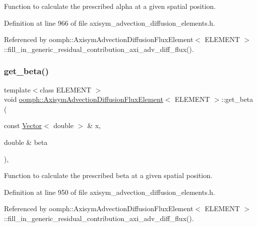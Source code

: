 Function to calculate the prescribed alpha at a given spatial position. 



Definition at line 966 of file axisym\+\_\+advection\+\_\+diffusion\+\_\+elements.\+h.



Referenced by oomph\+::\+Axisym\+Advection\+Diffusion\+Flux\+Element$<$ E\+L\+E\+M\+E\+N\+T $>$\+::fill\+\_\+in\+\_\+generic\+\_\+residual\+\_\+contribution\+\_\+axi\+\_\+adv\+\_\+diff\+\_\+flux().

\mbox{\label{classoomph_1_1AxisymAdvectionDiffusionFluxElement_ae221b92f7bf3ea7eeb26a1cc2b353941}} 
\subsubsection{\texorpdfstring{get\+\_\+beta()}{get\_beta()}}
{\footnotesize\ttfamily template$<$class E\+L\+E\+M\+E\+NT $>$ \\
void \hyperlink{classoomph_1_1AxisymAdvectionDiffusionFluxElement}{oomph\+::\+Axisym\+Advection\+Diffusion\+Flux\+Element}$<$ E\+L\+E\+M\+E\+NT $>$\+::get\+\_\+beta (\begin{DoxyParamCaption}\item[{const \hyperlink{classoomph_1_1Vector}{Vector}$<$ double $>$ \&}]{x,  }\item[{double \&}]{beta }\end{DoxyParamCaption})\hspace{0.3cm}{\ttfamily [inline]}, {\ttfamily [protected]}}



Function to calculate the prescribed beta at a given spatial position. 



Definition at line 950 of file axisym\+\_\+advection\+\_\+diffusion\+\_\+elements.\+h.



Referenced by oomph\+::\+Axisym\+Advection\+Diffusion\+Flux\+Element$<$ E\+L\+E\+M\+E\+N\+T $>$\+::fill\+\_\+in\+\_\+generic\+\_\+residual\+\_\+contribution\+\_\+axi\+\_\+adv\+\_\+diff\+\_\+flux().

